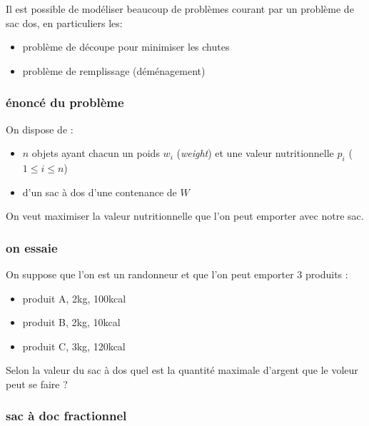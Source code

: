 \documentclass[
]{article}
\providecommand{\tightlist}{%
  \setlength{\itemsep}{0pt}\setlength{\parskip}{0pt}}
\begin{document}
Il est possible de modéliser beaucoup de problèmes courant par un
problème de sac dos, en particuliers les:

\begin{itemize}
\tightlist
\item
  problème de découpe pour minimiser les chutes
\item
  problème de remplissage (déménagement)
\end{itemize}

\hypertarget{uxe9noncuxe9-du-probluxe8me}{%
\subsubsection{énoncé du problème}\label{uxe9noncuxe9-du-probluxe8me}}

On dispose de :

\begin{itemize}
\tightlist
\item
  $n$ objets ayant chacun un poids $w_i$ (\emph{weight}) et une
  valeur nutritionnelle $p_i$ ($1 \leq i \leq n$)
\item
  d'un sac à dos d'une contenance de $W$
\end{itemize}

On veut maximiser la valeur nutritionnelle que l'on peut emporter avec
notre sac.

\hypertarget{on-essaie}{%
\subsubsection{on essaie}\label{on-essaie}}

On suppose que l'on est un randonneur et que l'on peut emporter 3
produits :

\begin{itemize}
\tightlist
\item
  produit A, 2kg, 100kcal
\item
  produit B, 2kg, 10kcal
\item
  produit C, 3kg, 120kcal
\end{itemize}

Selon la valeur du sac à dos quel est la quantité maximale d'argent que
le voleur peut se faire ?

\hypertarget{sac-uxe0-doc-fractionnel}{%
\subsubsection{sac à doc fractionnel}\label{sac-uxe0-doc-fractionnel}}
\end{document}
